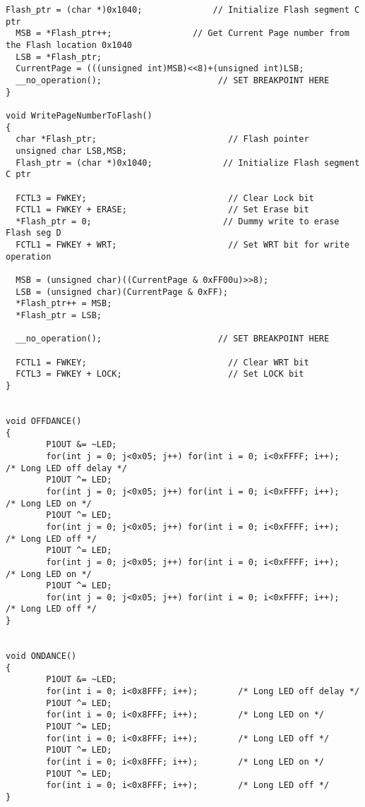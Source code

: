 \begin{lstlisting}[caption=Main.c,label=Code4]
  Flash_ptr = (char *)0x1040;              // Initialize Flash segment C ptr
  MSB = *Flash_ptr++;                // Get Current Page number from the Flash location 0x1040
  LSB = *Flash_ptr;
  CurrentPage = (((unsigned int)MSB)<<8)+(unsigned int)LSB;
  __no_operation();                       // SET BREAKPOINT HERE
}

void WritePageNumberToFlash()
{
  char *Flash_ptr;                          // Flash pointer
  unsigned char LSB,MSB;
  Flash_ptr = (char *)0x1040;              // Initialize Flash segment C ptr
  
  FCTL3 = FWKEY;                            // Clear Lock bit
  FCTL1 = FWKEY + ERASE;                    // Set Erase bit
  *Flash_ptr = 0;                          // Dummy write to erase Flash seg D
  FCTL1 = FWKEY + WRT;                      // Set WRT bit for write operation
  
  MSB = (unsigned char)((CurrentPage & 0xFF00u)>>8);
  LSB = (unsigned char)(CurrentPage & 0xFF);
  *Flash_ptr++ = MSB;
  *Flash_ptr = LSB;
  
  __no_operation();                       // SET BREAKPOINT HERE
  
  FCTL1 = FWKEY;                            // Clear WRT bit
  FCTL3 = FWKEY + LOCK;                     // Set LOCK bit
}


void OFFDANCE()
{
        P1OUT &= ~LED;
        for(int j = 0; j<0x05; j++) for(int i = 0; i<0xFFFF; i++);        /* Long LED off delay */
        P1OUT ^= LED;
        for(int j = 0; j<0x05; j++) for(int i = 0; i<0xFFFF; i++);        /* Long LED on */
        P1OUT ^= LED;
        for(int j = 0; j<0x05; j++) for(int i = 0; i<0xFFFF; i++);        /* Long LED off */
        P1OUT ^= LED;
        for(int j = 0; j<0x05; j++) for(int i = 0; i<0xFFFF; i++);        /* Long LED on */
        P1OUT ^= LED;
        for(int j = 0; j<0x05; j++) for(int i = 0; i<0xFFFF; i++);        /* Long LED off */  
}


void ONDANCE()
{
        P1OUT &= ~LED;
        for(int i = 0; i<0x8FFF; i++);        /* Long LED off delay */
        P1OUT ^= LED;
        for(int i = 0; i<0x8FFF; i++);        /* Long LED on */
        P1OUT ^= LED;
        for(int i = 0; i<0x8FFF; i++);        /* Long LED off */
        P1OUT ^= LED;
        for(int i = 0; i<0x8FFF; i++);        /* Long LED on */
        P1OUT ^= LED;
        for(int i = 0; i<0x8FFF; i++);        /* Long LED off */  
}
\end{lstlisting}
